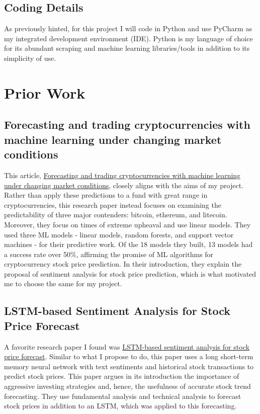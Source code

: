 \documentclass{article}
\begin{document}
\subsection{Coding Details}
\label{sec:coding}

As previously hinted, for this project I will code in Python and use PyCharm as my integrated development environment (IDE). Python is my language of choice for its abundant scraping and machine learning libraries/tools in addition to its simplicity of use.


\section{Prior Work}
\label{sec:priorwork}

\subsection{Forecasting and trading cryptocurrencies with machine learning under changing market conditions}

This article, \href{https://jfin-swufe.springeropen.com/articles/10.1186/s40854-020-00217-x}{Forecasting and trading cryptocurrencies with machine learning under changing market conditions}, closely aligns with the aims of my project. Rather than apply these predictions to a fund with great range in cryptocurrencies, this research paper instead focuses on examining the predictability of three major contenders: bitcoin, ethereum, and litecoin. Moreover, they focus on times of extreme upheaval and use linear models. They used three ML models - linear models, random forests, and support vector machines - for their predictive work. Of the 18 models they built, 13 models had a success rate over 50\%, affirming the promise of ML algorithms for cryptocurrency stock price prediction. In their introduction, they explain the proposal of sentiment analysis for stock price prediction, which is what motivated me to choose the same for my project.

\subsection{LSTM-based Sentiment Analysis for Stock Price Forecast}

A favorite research paper I found was \href{https://www.ncbi.nlm.nih.gov/pmc/articles/PMC7959635/}{LSTM-based sentiment analysis for stock price forecast}. Similar to what I propose to do, this paper uses a long short-term memory neural network with text sentiments and historical stock transactions to predict stock prices. This paper argues in its introduction the importance of aggressive investing strategies and, hence, the usefulness of accurate stock trend forecasting. They use fundamental analysis and technical analysis to forecast stock prices in addition to an LSTM, which was applied to this forecasting. \\
\end{document}
